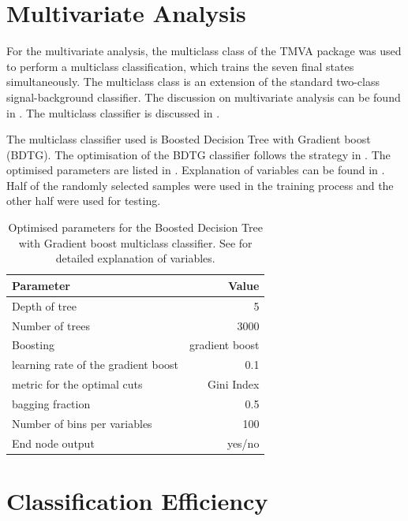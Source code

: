 \section{Multivariate Analysis}

For the multivariate analysis, the multiclass class of the TMVA package \cite{Therhaag:2009dp} was used to perform a multiclass classification, which trains the seven final states simultaneously. The multiclass class is an extension of the standard two-class signal-background classifier. The discussion on multivariate analysis can be found in . The multiclass classifier is discussed in .

The multiclass classifier used is Boosted Decision Tree with Gradient boost (BDTG). The optimisation of the BDTG classifier follows the strategy in . The optimised parameters are listed in . Explanation of variables can be found in .  Half of the randomly selected samples were used in the training process and the other half were used for testing.

\begin{table}[!tbp]\centering
\begin{tabular}{lr}
\hline \hline
 Parameter &  Value \\
\hline
Depth of tree & 5 \\
Number of trees & 3000 \\
Boosting & gradient boost \\
learning rate of the gradient boost & 0.1 \\
metric for the optimal cuts & Gini Index \\
bagging fraction & 0.5 \\
Number of bins per variables & 100 \\
End node output & yes/no \\
\hline \hline
\end{tabular}

\caption
{Optimised parameters for the Boosted Decision Tree with Gradient boost multiclass classifier. See  for detailed explanation of variables.}
\label{tab:tauBDTparameters}
\end{table}


\section{Classification Efficiency}

